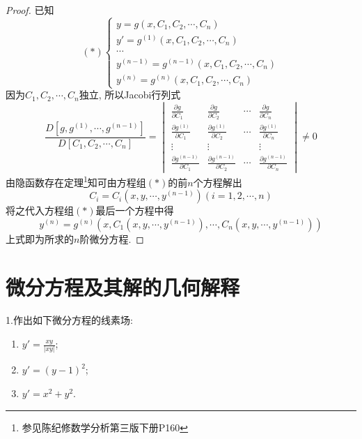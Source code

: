 \begin{proof}已知
\[(*)\begin{cases}
y=g(x,C_1,C_2,\cdots,C_n)\\
y'=g^{(1)}(x,C_1,C_2,\cdots,C_n)\\\cdots\\
y^{(n-1)}=g^{(n-1)}(x,C_1,C_2,\cdots,C_n)\\
y^{(n)}=g^{(n)}(x,C_1,C_2,\cdots,C_n)
\end{cases}\]
因为$C_1,C_2,\cdots,C_n$独立, 所以Jacobi行列式
\[\frac{D[g,g^{(1)},\cdots,g^{(n-1)}]}{D[C_1,C_2,\cdots,C_n]}=\begin{vmatrix}
\frac{\partial g}{\partial C_1}&\frac{\partial g}{\partial C_2}&\cdots&\frac{\partial g}{\partial C_n}
\\
\frac{\partial g^{(1)}}{\partial C_1}&\frac{\partial g^{(1)}}{\partial C_2}&\cdots&\frac{\partial g^{(1)}}{\partial C_n}\\
\vdots&\vdots&&\vdots\\
\frac{\partial g^{(n-1)}}{\partial C_1}&\frac{\partial g^{(n-1)}}{\partial C_2}&\cdots&\frac{\partial g^{(n-1)}}{\partial C_n}\end{vmatrix}\neq0\]
由隐函数存在定理\footnote{参见陈纪修数学分析第三版下册P160}知可由方程组$(*)$的前$n$个方程解出
\[C_i=C_i(x,y,\cdots,y^{(n-1)})(i=1,2,\cdots,n)\]
将之代入方程组$(*)$最后一个方程中得
\[y^{(n)}=g^{(n)}(x,C_1(x,y,\cdots,y^{(n-1)}),\cdots,C_n(x,y,\cdots,y^{(n-1)}))\]
上式即为所求的$n$阶微分方程.
\end{proof}


\section{微分方程及其解的几何解释}


1.作出如下微分方程的线素场:
\begin{enumerate}[(1)]
\item $\displaystyle y'=\frac{xy}{|xy|}$;
\item $y'=(y-1)^2$;
\item $y'=x^2+y^2$.
\end{enumerate}

